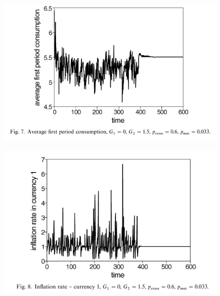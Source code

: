 \begin{frame}

    \begin{figure}
        \includegraphics[width = \textwidth]{fig/small_c.png}
    \end{figure}

\end{frame}

\begin{frame}

    \begin{figure}
        \includegraphics[width = \textwidth]{fig/small_i.png}
    \end{figure}

\end{frame}

